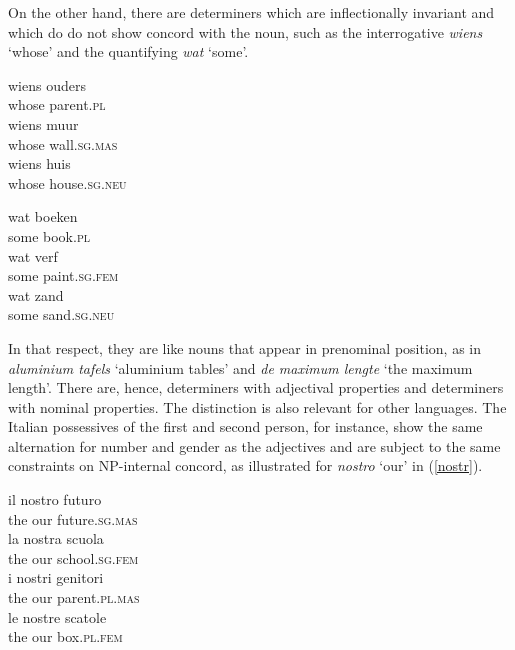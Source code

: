 \documentclass[output=paper
                ,modfonts
                ,nonflat
	        ,collection
	        ,collectionchapter
	        ,collectiontoclongg
 	        ,biblatex
                ,babelshorthands
                ,newtxmath
                ,draftmode
                ,colorlinks, citecolor=brown
]{./langsci/langscibook}
\begin{document}
\noindent
On the other hand, there are determiners which are inflectionally invariant and which do 
do not show concord with the noun, such as the interrogative \emph{wiens} `whose' 
and the quantifying \emph{wat} `some'. 

\begin{exe} 
\ex\label{wiens}
\begin{xlist} 
\ex
\gll  wiens ouders \\ 
      whose parent.\textsc{pl} \\
\ex
\gll  wiens muur \\ 
      whose wall.\textsc{sg.mas} \\
\ex
\gll  wiens huis \\ 
      whose house.\textsc{sg.neu} \\
\end{xlist}
\ex\label{wat}
\begin{xlist}
\ex
\gll  wat boeken  \\
      some book.\textsc{pl} \\
\ex
\gll  wat verf                  \\
      some paint.\textsc{sg.fem} \\
\ex
\gll  wat zand  \\
      some sand.\textsc{sg.neu} \\
\end{xlist} 
\end{exe} 

\noindent
In that respect, they are like nouns that appear in prenominal position,
as in \emph{aluminium tafels} `aluminium tables' and \emph{de maximum lengte}
`the maximum length'. There are, hence, determiners with adjectival 
properties and determiners with nominal properties.   
The distinction is also relevant for other languages. The Italian 
possessives of the first and second person, for instance, 
show the same alternation for number and gender as the adjectives
and are subject to the same constraints on NP-internal concord, as illustrated 
for \emph{nostro} `our' in (\ref{nostr}). 

\begin{exe}  
\ex\label{nostr} 
\begin{xlist}
\ex 
\gll  il nostro futuro \\
      the our future.\textsc{sg.mas} \\ 
\ex 
\gll  la nostra scuola  \\
      the our school.\textsc{sg.fem} \\ 
\ex 
\gll  i nostri genitori \\
      the our parent.\textsc{pl.mas} \\ 
\ex 
\gll  le nostre scatole \\
      the our box.\textsc{pl.fem} \\ 
\end{xlist}
\end{exe} 
\end{document}

